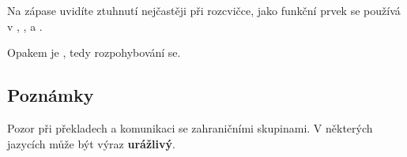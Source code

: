 \documentclass[main.tex]{subfiles}
\begin{document}
Na zápase uvidíte ztuhnutí nejčastěji při rozcvičce, jako funkční prvek se používá  v , ,  a  . 
 
Opakem  je , tedy rozpohybování se.  
 
 
 
\subsection{ Poznámky }  
Pozor při překladech a komunikaci se zahraničními skupinami. V některých jazycích může být výraz  \textbf{urážlivý}. 
 
 
\end{document}
